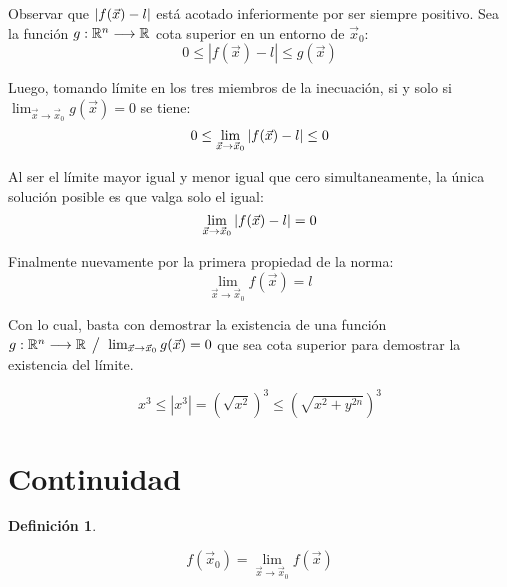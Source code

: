 \documentclass[a5paper,12pt,twoside]{book}
\newtheorem{defn}{{Definición}}[chapter]
\begin{document}
Observar que ${\left| {f(\Vec{x})-l} \right|}$ está acotado inferiormente por ser siempre positivo.
Sea la función $g:\mathbb{R}^n \longrightarrow \mathbb{R}$ cota superior en un entorno de $\Vec{x}_0$:
\begin{equation*}
    0 \leq |f(\Vec{x})-l| \leq g(\Vec{x})
\end{equation*}

Luego, tomando límite en los tres miembros de la inecuación, si y solo si $\lim_{\Vec{x} \to \Vec{x}_0} g(\Vec{x})=0$ se tiene:
\begin{equation*}
    0 \leq \lim_{\Vec{x} \to \Vec{x}_0} {\left| {f(\Vec{x})-l} \right|} \leq 0
\end{equation*}

Al ser el límite mayor igual y menor igual que cero simultaneamente, la única solución posible es que valga solo el igual:
\begin{equation*}
    \lim_{\Vec{x} \to \Vec{x}_0} {\left| {f(\Vec{x})-l} \right|} = 0
\end{equation*}

Finalmente nuevamente por la primera propiedad de la norma:
\begin{equation*}
    \lim_{\Vec{x} \to \Vec{x}_0} f(\Vec{x}) = l
\end{equation*}

Con lo cual, basta con demostrar la existencia de una función $g:\mathbb{R}^n \longrightarrow \mathbb{R} \hspace{1ex} \big/ \hspace{1ex} \lim_{\Vec{x} \to \Vec{x}_0} g(\Vec{x})=0$ que sea cota superior para demostrar la existencia del límite.



\begin{equation*}
x^3 \leq |x^3| = \left( \sqrt{x^2} \right)^3 \leq \left( \sqrt{x^2+y^{2n}} \right)^3
\end{equation*}


\section{Continuidad}

\begin{mdframed}[style=DefinitionFrame]
    \begin{defn}
    \end{defn}
    \begin{equation*}
        f(\Vec{x}_0)= \lim_{\Vec{x} \to \Vec{x}_0} f(\Vec{x})
    \end{equation*}
\end{mdframed}
\end{document}
